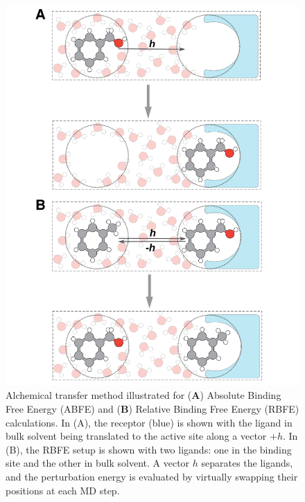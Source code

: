 \documentclass[9pt,bestpractices]{livecoms}
\begin{document}

\begin{figure}[h!]
    \centering
    \includegraphics[width=0.95\linewidth]
    {paper/figures_atm/atm_scheme_abfe_rbfe.pdf}
    \caption{\small Alchemical transfer method illustrated for (\textbf{A}) Absolute Binding Free Energy (ABFE) and (\textbf{B}) Relative Binding Free Energy (RBFE) calculations. In (A), the receptor (blue) is shown with the ligand in bulk solvent being translated to the active site along a vector $+h$. In (B), the RBFE setup is shown with two ligands: one in the binding site and the other in bulk solvent. A vector $h$ separates the ligands, and the perturbation energy is evaluated by virtually swapping their positions at each MD step.}
    \label{fig:atm-illustration}
\end{figure}
\end{document}
